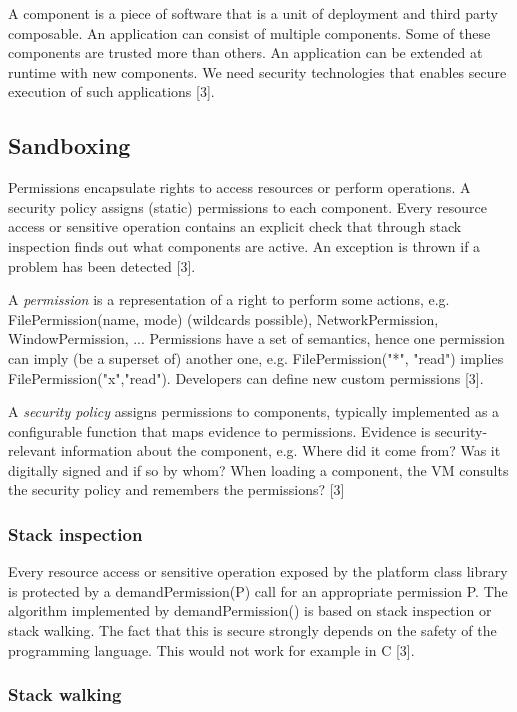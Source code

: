 A component is a piece of software that is a unit of deployment and third party composable. An application can consist of multiple components. Some of these components are trusted more than others. An application can be extended at runtime with new components. We need security technologies that enables secure execution of such applications [3].


\subsection{Sandboxing}

Permissions encapsulate rights to access resources or perform operations. A security policy assigns (static) permissions to each component. Every resource access or sensitive operation contains an explicit check that through stack inspection finds out what components are active. An exception is thrown if a problem has been detected [3].

A \emph{permission} is a representation of a right to perform some actions, e.g. FilePermission(name, mode) (wildcards possible), NetworkPermission, WindowPermission, ... Permissions have a set of semantics, hence one permission can imply (be a superset of) another one, e.g. FilePermission("*", "read") implies FilePermission("x","read"). Developers can define new custom permissions [3].

A \emph{security policy} assigns permissions to components, typically implemented as a configurable function that maps evidence to permissions. Evidence is security-relevant information about the component, e.g. Where did it come from? Was it digitally signed and if so by whom? When loading a component, the VM consults the security policy and remembers the permissions? [3]


\subsubsection{Stack inspection}

Every resource access or sensitive operation exposed by the platform class library is protected by a demandPermission(P) call for an appropriate permission P. The algorithm implemented by demandPermission() is based on stack inspection or stack walking. The fact that this is secure strongly depends on the safety of the programming language. This would not work for example in C [3].

\subsubsection{Stack walking}

